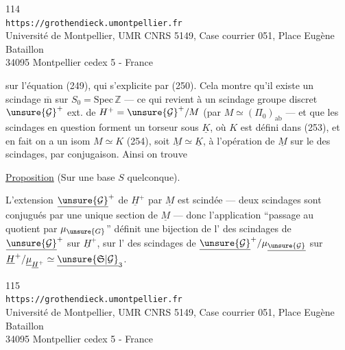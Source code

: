 
\begin{center}
\small
114\\
\texttt{https://grothendieck.umontpellier.fr}\\
Université de Montpellier, UMR CNRS 5149, Case courrier 051, Place Eugène Bataillon\\
34095 Montpellier cedex 5 - France
\end{center}


sur l'équation (249), qui s'explicite par (250).
Cela montre qu'il existe un scindage
$\overline{\mathrm m}$ sur $S_0=\mathrm{Spec}\,\mathbb Z$
--- ce qui revient à un scindage  groupe discret
$\unsure{\mathcal G}^+$ ext. de
$H^+=\unsure{\mathcal G}^+/M$
(par $M\simeq(\Pi_0)_{\mathrm{ab}}$ \unsure{)}
--- et que les scindages en question forment un
torseur sous $\underline K$, où $K$
est défini dans (253), et en fait 
on a un isom $M\simeq K$ (254), soit
$\underline M\simeq\underline K$, 
à l'opération de $\underline M$ sur le 
des scindages, par conjugaison. Ainsi on trouve

\uline{Proposition} (Sur une base $S$ quelconque).

L'extension $\underline{\unsure{\mathcal G}}^+$ de
$\underline H^+$ par $\underline M$ est scindée ---
deux scindages sont conjugués par une unique section
de $\underline M$ --- donc l'application 
``passage au quotient par $\mu_{\unsure{G}}$'' définit une
bijection de l' des scindages de
$\underline{\unsure{\mathcal G}}^+$ sur $\underline H^+$,
sur l' des scindages de
$\underline{\unsure{\mathcal G}}^+/\mu_{\underline{\unsure{\mathcal G}}}$
sur $\underline H^+/\underline\mu_{\underline H^+}
\simeq\underline{\unsure{\mathfrak S|\mathcal G}}_3$.


\begin{center}
\small
115\\
\texttt{https://grothendieck.umontpellier.fr}\\
Université de Montpellier, UMR CNRS 5149, Case courrier 051, Place Eugène Bataillon\\
34095 Montpellier cedex 5 - France
\end{center}


